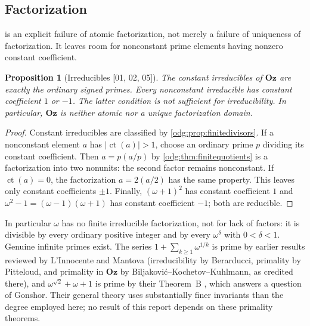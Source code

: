 \documentclass[11pt,oneside]{article}
\numberwithin{equation}{section}
\newtheorem{proposition}[proposition]{Proposition}
\theoremstyle{definition}
\theoremstyle{remark}
\newcommand{\Oz}{\mathbf{Oz}}
\newcommand{\ct}{\operatorname{ct}}
\newcommand{\src}[1]{\textup{\textsf{\small[#1]}}}
\begin{document}
\subsection{Factorization}\label{odg:sub:factorization}

 is an explicit failure of atomic factorization, not
merely a failure of uniqueness of factorization. It leaves room for
nonconstant prime elements having nonzero constant coefficient.

\begin{proposition}[Irreducibles \src{01, 02, 05}]\label{odg:prop:irreduciblect}
The constant irreducibles of $\Oz$ are exactly the ordinary signed primes.
Every nonconstant irreducible has constant coefficient $1$ or $-1$.
The latter condition is not sufficient for irreducibility. In particular,
$\Oz$ is neither atomic nor a unique factorization domain.
\end{proposition}
\begin{proof}
Constant irreducibles are classified by \cref{odg:prop:finitedivisors}. If a
nonconstant element $a$ has $|\ct(a)|>1$, choose an ordinary prime $p$
dividing its constant coefficient. Then $a=p(a/p)$ by
\cref{odg:thm:finitequotients} is a factorization into two nonunits: the
second factor remains nonconstant. If $\ct(a)=0$, the factorization
$a=2(a/2)$ has the same property. This leaves only constant coefficients
$\pm1$. Finally, $(\omega+1)^2$ has constant coefficient $1$ and
$\omega^2-1=(\omega-1)(\omega+1)$ has constant coefficient $-1$; both are
reducible.
\end{proof}

In particular $\omega$ has no finite irreducible factorization, not for lack
of factors: it is divisible by every ordinary positive integer and by every
$\omega^\delta$ with $0<\delta<1$. Genuine infinite primes exist. The series
$1+\sum_{k\ge1}\omega^{1/k}$ is prime by earlier results reviewed by
L'Innocente and Mantova \cite[Section 1.3]{LM} (irreducibility by Berarducci,
primality by Pitteloud, and primality in $\Oz$ by
Biljakovi\'c--Kochetov--Kuhlmann, as credited there), and
$\omega^{\sqrt2}+\omega+1$ is prime by their Theorem~B \cite[Theorem B]{LM},
which answers a question of Gonshor. Their general theory uses substantially
finer invariants than the degree employed here; no result of this report
depends on these primality theorems.
\end{document}
